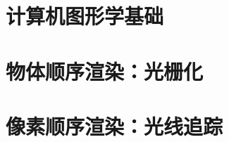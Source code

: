 \documentclass{xNoteBook}
\begin{document}
\clearpage

\tableofcontents
\listoffigures
\listoftables

\mainmatter
\nocite{*}

\part{计算机图形学基础}








\part{物体顺序渲染：光栅化}





\part{像素顺序渲染：光线追踪}






\appendix

\backmatter



\end{document}
